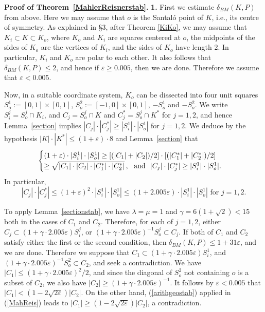 \documentclass[12pt]{article}
\begin{document}

{\bf Proof of Theorem~\ref{MahlerReisnerstab}.}
{\bf{1.}} First we estimate $\delta _{BM}(K,P)$ from above.
Here we may assume that $o$ is the Santal\'o point of $K$, i.e., its centre of
symmetry.
As explained in \S 3, after Theorem \ref{KiKo}, we may
assume that $K_i\subset K\subset K_o$,
where $K_o$ and $K_i$ are squares centered at $o$,
the midpoints of the sides of $K_o$ are the vertices of $K_i$, and the sides
of $K_o$ have length $2$.
In particular, $K_i$ and $K_o$ are polar to each other.
It also follows that $\delta_{BM}(K,P)\leq 2$,
and hence if $\varepsilon\geq 0.005$, then we are done.
Therefore we assume that  $\varepsilon< 0.005$.

Now, in a suitable coordinate system, 
$K_o$ can be dissected into four unit squares
$S^1_o:=[0,1] \times [0,1]$, $S^2_o:=[-1,0] \times [0,1]$, 
$-S^1_o$ and $-S^2_o$.
 We write $S^j_i=S^j_o\cap K_i$, and $C_j=S^j_o\cap K$
 and $C^*_j=S^j_o\cap K^*$
 for $j=1,2$, and hence 
Lemma~\ref{section} implies $|C_j|\cdot|C^*_j|\geq |S^1_i|\cdot|S^1_o|$
 for $j=1,2$. We deduce by the hypothesis 
 $|K|\cdot|K^*|\leq (1+\varepsilon)\cdot 8 $ and Lemma~\ref{section} that
\begin{eqnarray}
\label{MahReis}
\begin{cases}
 (1+\varepsilon) \cdot |S^1_i|\cdot|S^1_o|\geq 
 [(|C_1|+|C_2|)/2] \cdot [(|C^*_1|+|C^*_2|)/2] \\
\geq\sqrt{|C_1|\cdot|C_2|\cdot|C^*_1|\cdot|C^*_2|}\,, 
{\text{\,\,\,\,and\,\,\,\,}}
 |C_j|\cdot |C^*_j| \geq |S^1_i|\cdot|S^1_o|.
\end{cases}
\end{eqnarray}
In particular,
 $$
 |C_j|\cdot|C^*_j|\leq(1+\varepsilon)^2 \cdot |S^1_i|\cdot|S^1_o|
 \leq(1+2.005\varepsilon) \cdot |S^1_i|\cdot|S^1_o|
 \mbox{ \ for $j=1,2$}.
 $$

To apply Lemma~\ref{sectionstab}, 
we have $\lambda=\mu=1$ and $\gamma=6(1+\sqrt{2})<15$
 both in the cases of $C_1$ and $C_2$.
Therefore, for each of $j=1,2$,
either $C_j\subset (1+\gamma \cdot 2.005\varepsilon)S^j_i$,
or $(1+\gamma \cdot 2.005\varepsilon)^{-1}S^j_o\subset C_j$.
If both of $C_1$ and $C_2$ satisfy either the first 
or the second condition, then $\delta_{BM}(K,P)\leq 1+31\varepsilon$,
and we are done. Therefore
we suppose that $C_1\subset (1+\gamma \cdot 2.005\varepsilon)S^1_i$,
and $(1+\gamma \cdot 2.005\varepsilon)^{-1}S^2_o\subset C_2$,
and seek a contradiction.
We have $|C_1|\leq (1+\gamma \cdot 2.005\varepsilon)^2/2$,
and since the diagonal of $S^2_o$ not containing $o$
is a subset of $C_2$, we also have
$|C_2|\geq (1+\gamma \cdot 2.005\varepsilon)^{-1}$.
It follows by $\varepsilon<0.005$ that
$|C_1|<(1-2\sqrt{2\varepsilon})|C_2|$.
On the other hand, (\ref{arithgeostab}) applied in (\ref{MahReis}) leads to
$|C_1|\geq(1-2\sqrt{2\varepsilon})|C_2|$, a
contradiction. 
\end{document}
